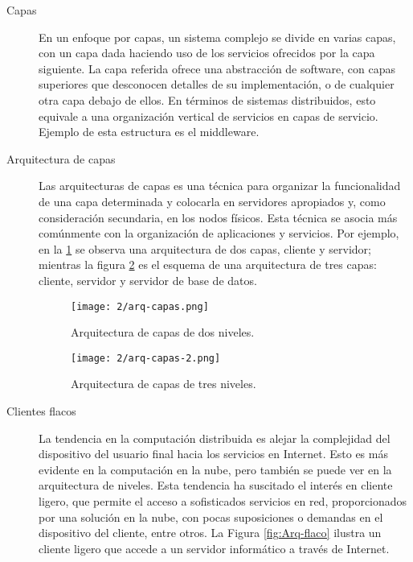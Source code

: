 \begin{description}
	\item[Capas] En un enfoque por capas, un sistema complejo se divide en varias capas, con un capa dada haciendo uso de los servicios ofrecidos por la capa siguiente. La capa referida ofrece una abstracción de software, con capas superiores que desconocen detalles de su implementación, o  de cualquier otra capa debajo de ellos.
	En términos de sistemas distribuidos, esto equivale a una organización vertical de servicios en capas de servicio.  Ejemplo de esta estructura es el \gls{middleware}. 
	
	\item[Arquitectura de capas] Las arquitecturas de capas 
	es una técnica para organizar la funcionalidad de una capa determinada y colocarla en servidores apropiados y, como consideración secundaria, en los nodos físicos. Esta  técnica se asocia más comúnmente con la organización de aplicaciones y servicios. Por ejemplo, en la \ref{fig:Arq-capas} se observa una arquitectura de dos capas, cliente y servidor; mientras la figura \ref{fig:Arq-capas-3} es el esquema de una arquitectura de tres capas: cliente, servidor y servidor de base de datos.
	
	\begin{figure}%
		\texttt{[image: 2/arq-capas.png]} 
		\caption{Arquitectura de capas de dos niveles.}
		\label{fig:Arq-capas}
	\end{figure}
	
	\begin{figure}%
 	\texttt{[image: 2/arq-capas-2.png]}
	\caption{Arquitectura de capas de tres niveles.}
	\label{fig:Arq-capas-3}
\end{figure}

	
	\item[Clientes flacos] La tendencia en la computación distribuida es alejar la complejidad del dispositivo del usuario final hacia los servicios en Internet. Esto es más evidente en  la computación en la nube,  pero también se puede ver en la arquitectura de niveles.  Esta tendencia ha suscitado el interés en  \gls{cliente ligero}, que  permite el acceso a sofisticados servicios en red, proporcionados por una solución en la nube, con pocas suposiciones o demandas en el dispositivo del cliente, entre otros.  La Figura \ref{fig:Arq-flaco}  ilustra un cliente ligero que accede a un servidor informático a través de Internet.
	

\end{description}
